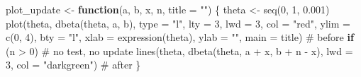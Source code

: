 \documentclass[
  letterpaper,
  DIV=11,
  numbers=noendperiod]{scrartcl}
\newenvironment{Shaded}{\begin{snugshade}}{\end{snugshade}}
\newcommand{\AttributeTok}[1]{\textcolor[rgb]{0.40,0.45,0.13}{#1}}
\newcommand{\CommentTok}[1]{\textcolor[rgb]{0.37,0.37,0.37}{#1}}
\newcommand{\ControlFlowTok}[1]{\textcolor[rgb]{0.00,0.23,0.31}{\textbf{#1}}}
\newcommand{\DecValTok}[1]{\textcolor[rgb]{0.68,0.00,0.00}{#1}}
\newcommand{\FloatTok}[1]{\textcolor[rgb]{0.68,0.00,0.00}{#1}}
\newcommand{\FunctionTok}[1]{\textcolor[rgb]{0.28,0.35,0.67}{#1}}
\newcommand{\NormalTok}[1]{\textcolor[rgb]{0.00,0.23,0.31}{#1}}
\newcommand{\OtherTok}[1]{\textcolor[rgb]{0.00,0.23,0.31}{#1}}
\newcommand{\SpecialCharTok}[1]{\textcolor[rgb]{0.37,0.37,0.37}{#1}}
\newcommand{\StringTok}[1]{\textcolor[rgb]{0.13,0.47,0.30}{#1}}
\begin{document}
\begin{Shaded}
\begin{Highlighting}[]
\NormalTok{plot\_update }\OtherTok{\textless{}{-}} \ControlFlowTok{function}\NormalTok{(a, b, x, n, }\AttributeTok{title =} \StringTok{""}\NormalTok{) \{}
\NormalTok{  theta }\OtherTok{\textless{}{-}} \FunctionTok{seq}\NormalTok{(}\DecValTok{0}\NormalTok{, }\DecValTok{1}\NormalTok{, }\FloatTok{0.001}\NormalTok{)}
  \FunctionTok{plot}\NormalTok{(theta, }\FunctionTok{dbeta}\NormalTok{(theta, a, b), }\AttributeTok{type =} \StringTok{"l"}\NormalTok{, }\AttributeTok{lty =} \DecValTok{3}\NormalTok{, }\AttributeTok{lwd =} \DecValTok{3}\NormalTok{, }\AttributeTok{col =} \StringTok{"red"}\NormalTok{,}
       \AttributeTok{ylim =} \FunctionTok{c}\NormalTok{(}\DecValTok{0}\NormalTok{, }\DecValTok{4}\NormalTok{), }\AttributeTok{bty =} \StringTok{"l"}\NormalTok{, }\AttributeTok{xlab =} \FunctionTok{expression}\NormalTok{(theta), }\AttributeTok{ylab =} \StringTok{""}\NormalTok{,}
       \AttributeTok{main =}\NormalTok{ title)                                            }\CommentTok{\# before}
  \ControlFlowTok{if}\NormalTok{ (n }\SpecialCharTok{\textgreater{}} \DecValTok{0}\NormalTok{)                                                    }\CommentTok{\# no test, no update}
    \FunctionTok{lines}\NormalTok{(theta, }\FunctionTok{dbeta}\NormalTok{(theta, a }\SpecialCharTok{+}\NormalTok{ x, b }\SpecialCharTok{+}\NormalTok{ n }\SpecialCharTok{{-}}\NormalTok{ x), }\AttributeTok{lwd =} \DecValTok{3}\NormalTok{, }\AttributeTok{col =} \StringTok{"darkgreen"}\NormalTok{)  }\CommentTok{\# after}
\NormalTok{\}}
\end{Highlighting}
\end{Shaded}
\end{document}
